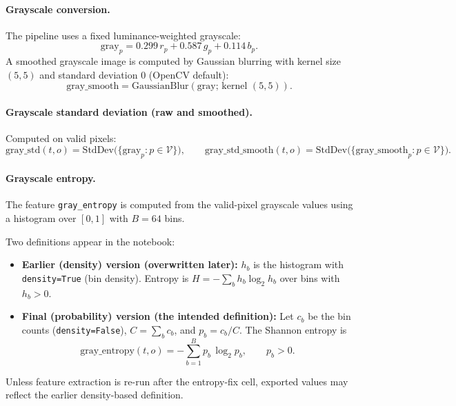 \documentclass{article}
\begin{document}
\paragraph{Grayscale conversion.}
The pipeline uses a fixed luminance-weighted grayscale:
\begin{equation}
\mathrm{gray}_p = 0.299\,r_p + 0.587\,g_p + 0.114\,b_p.
\end{equation}
A smoothed grayscale image is computed by Gaussian blurring with kernel size $(5,5)$ and standard deviation $0$ (OpenCV default):
\begin{equation}
\mathrm{gray\_smooth} = \mathrm{GaussianBlur}(\mathrm{gray};\,\text{kernel }(5,5)).
\end{equation}

\paragraph{Grayscale standard deviation (raw and smoothed).}
Computed on valid pixels:
\begin{equation}
\mathrm{gray\_std}(t,o)=\mathrm{StdDev}\bigl(\{\mathrm{gray}_p: p\in\mathcal{V}\}\bigr),\qquad
\mathrm{gray\_std\_smooth}(t,o)=\mathrm{StdDev}\bigl(\{\mathrm{gray\_smooth}_p: p\in\mathcal{V}\}\bigr).
\end{equation}

\paragraph{Grayscale entropy.}
The feature \texttt{gray\_entropy} is computed from the valid-pixel grayscale values using a histogram over $[0,1]$ with $B=64$ bins.

Two definitions appear in the notebook:
\begin{itemize}[leftmargin=*, itemsep=2pt]
\item \textbf{Earlier (density) version (overwritten later):}
$h_b$ is the histogram with \texttt{density=True} (bin density). Entropy is
$H=-\sum_b h_b\log_2 h_b$ over bins with $h_b>0$.
\item \textbf{Final (probability) version (the intended definition):}
Let $c_b$ be the bin counts (\texttt{density=False}), $C=\sum_b c_b$, and $p_b=c_b/C$.
The Shannon entropy is
\begin{equation}
\mathrm{gray\_entropy}(t,o) = -\sum_{b=1}^{B} p_b\,\log_2 p_b,\qquad p_b>0.
\end{equation}
\end{itemize}
\noindent
Unless feature extraction is re-run after the entropy-fix cell, exported values may reflect the earlier density-based definition.
\end{document}

